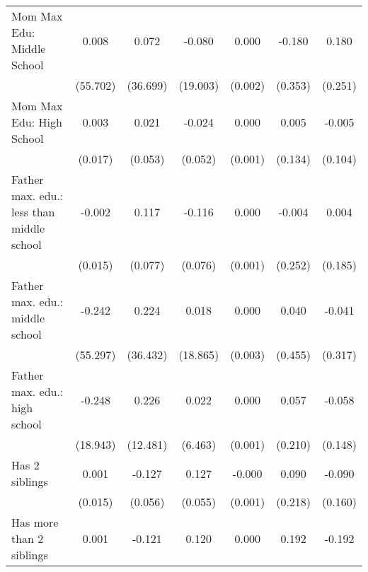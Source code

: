 {\begin{tabular}{l*{6}{c}}
\addlinespace
Mom Max Edu: Middle School&       0.008         &       0.072         &      -0.080         &       0.000         &      -0.180         &       0.180         \\
                    &    (55.702)         &    (36.699)         &    (19.003)         &     (0.002)         &     (0.353)         &     (0.251)         \\
\addlinespace
Mom Max Edu: High School&       0.003         &       0.021         &      -0.024         &       0.000         &       0.005         &      -0.005         \\
                    &     (0.017)         &     (0.053)         &     (0.052)         &     (0.001)         &     (0.134)         &     (0.104)         \\
\addlinespace
Father max. edu.: less than middle school&      -0.002         &       0.117         &      -0.116         &       0.000         &      -0.004         &       0.004         \\
                    &     (0.015)         &     (0.077)         &     (0.076)         &     (0.001)         &     (0.252)         &     (0.185)         \\
\addlinespace
Father max. edu.: middle school&      -0.242         &       0.224         &       0.018         &       0.000         &       0.040         &      -0.041         \\
                    &    (55.297)         &    (36.432)         &    (18.865)         &     (0.003)         &     (0.455)         &     (0.317)         \\
\addlinespace
Father max. edu.: high school&      -0.248         &       0.226         &       0.022         &       0.000         &       0.057         &      -0.058         \\
                    &    (18.943)         &    (12.481)         &     (6.463)         &     (0.001)         &     (0.210)         &     (0.148)         \\
\addlinespace
Has 2 siblings      &       0.001         &      -0.127\sym{*}  &       0.127\sym{*}  &      -0.000         &       0.090         &      -0.090         \\
                    &     (0.015)         &     (0.056)         &     (0.055)         &     (0.001)         &     (0.218)         &     (0.160)         \\
\addlinespace
Has more than 2 siblings&       0.001         &      -0.121         &       0.120         &       0.000         &       0.192         &      -0.192         \\

\end{tabular}}
